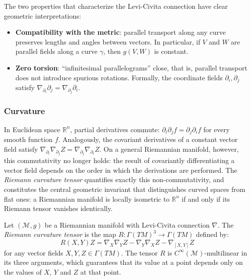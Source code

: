 \begin{remark}\label{rem:interpretacion_levi_civita}
The two properties that characterize the Levi-Civita connection have clear geometric interpretations:
\begin{itemize}
	\item \textbf{Compatibility with the metric}: parallel transport along any curve preserves lengths and angles between vectors. In particular, if $V$ and $W$ are parallel fields along a curve $\gamma$, then $g(V,W)$ is constant.
	\item \textbf{Zero torsion}: ``infinitesimal parallelograms'' close, that is, parallel transport does not introduce spurious rotations. Formally, the coordinate fields $\partial_i, \partial_j$ satisfy $\nabla_{\partial_i}\partial_j = \nabla_{\partial_j}\partial_i$.
\end{itemize}
\end{remark}

\subsubsection{Curvature}\label{subsec:curvatura_riemanniana}

In Euclidean space $\mathbb{R}^n$, partial derivatives commute: $\partial_i \partial_j f = \partial_j \partial_i f$ for every smooth function $f$. Analogously, the covariant derivatives of a constant vector field satisfy $\nabla_{\partial_i} \nabla_{\partial_j} Z = \nabla_{\partial_j} \nabla_{\partial_i} Z$. On a general Riemannian manifold, however, this commutativity no longer holds: the result of covariantly differentiating a vector field depends on the order in which the derivations are performed. The \textit{Riemann curvature tensor} quantifies exactly this non-commutativity, and constitutes the central geometric invariant that distinguishes curved spaces from flat ones: a Riemannian manifold is locally isometric to $\mathbb{R}^n$ if and only if its Riemann tensor vanishes identically.

\begin{definition}\label{def:tensor_riemann}
Let $(\mathcal{M}, g)$ be a Riemannian manifold with Levi-Civita connection $\nabla$. The \textit{Riemann curvature tensor} is the map $R\colon \Gamma(TM)^3 \to \Gamma(TM)$ defined by:
\[
R(X,Y)Z = \nabla_X \nabla_Y Z - \nabla_Y \nabla_X Z - \nabla_{[X,Y]} Z
\]
for any vector fields $X, Y, Z \in \Gamma(TM)$. The tensor $R$ is $C^\infty(\mathcal{M})$-multilinear in its three arguments, which guarantees that its value at a point depends only on the values of $X$, $Y$ and $Z$ at that point.
\end{definition}

